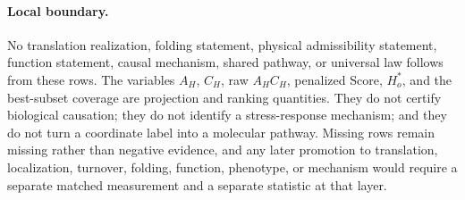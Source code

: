 \paragraph{Local boundary.}
No translation realization, folding statement, physical admissibility statement, function statement, causal mechanism, shared pathway, or universal law follows from these rows.  The variables $A_H$, $C_H$, raw $A_HC_H$, penalized Score, $H_o^{*}$, and the best-subset coverage are projection and ranking quantities.  They do not certify biological causation; they do not identify a stress-response mechanism; and they do not turn a coordinate label into a molecular pathway.  Missing rows remain missing rather than negative evidence, and any later promotion to translation, localization, turnover, folding, function, phenotype, or mechanism would require a separate matched measurement and a separate statistic at that layer.